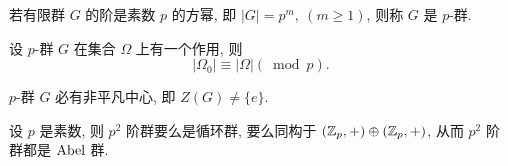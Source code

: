 \begin{definition}\label{p-群}
	若有限群 $G$ 的阶是素数 $p$ 的方幂, 即 $|G|=p^m,\ (m\geqslant 1)$, 则称 $G$ 是 $p$-群.
\end{definition}

\begin{proposition}
	设 $p$-群 $G$ 在集合 $\Omega$ 上有一个作用, 则
	$$|\Omega_0|\equiv|\Omega|(\bmod p).$$
\end{proposition}

\begin{corollary}
	$p$-群 $G$ 必有非平凡中心, 即 $Z(G)\neq \{e\}$.
\end{corollary}

\begin{corollary}
	设 $p$ 是素数, 则 $p^2$ 阶群要么是循环群, 要么同构于 $(\mathbb {Z}_{p},+)\oplus(\mathbb {Z}_{p},+)$, 从而 $p^2$ 阶群都是 $\text {Abel}$ 群.
\end{corollary}